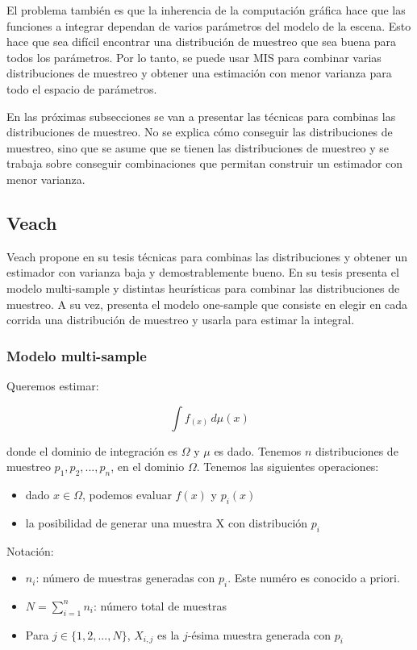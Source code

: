 \documentclass{article}
\begin{document}
El problema también es que la inherencia de la computación gráfica hace que las funciones a integrar dependan de varios parámetros del modelo de la escena.
Esto hace que sea difícil encontrar una distribución de muestreo que sea buena para todos los parámetros.
Por lo tanto, se puede usar MIS para combinar varias distribuciones de muestreo y obtener una estimación con menor varianza para todo el espacio de parámetros.

En las próximas subsecciones se van a presentar las técnicas para combinas las distribuciones de muestreo.
No se explica cómo conseguir las distribuciones de muestreo, sino que se asume que se tienen las distribuciones de muestreo y se trabaja sobre conseguir combinaciones que permitan construir un estimador con menor varianza.

\subsection{Veach}

Veach propone en su tesis técnicas para combinas las distribuciones y obtener un estimador con varianza baja y demostrablemente bueno.
En su tesis presenta el modelo multi-sample y distintas heurísticas para combinar las distribuciones de muestreo.
A su vez, presenta el modelo one-sample que consiste en elegir en cada corrida una distribución de muestreo y usarla para estimar la integral.

\subsubsection{Modelo multi-sample}

Queremos estimar:

$$ \int f_(x) \,d\mu(x)$$

donde el dominio de integración es $\Omega$ y $\mu$ es dado. Tenemos $n$ distribuciones de muestreo $p_{1}, p_{2}, ..., p_{n}$, en el dominio $\Omega$.
Tenemos las siguientes operaciones:
\begin{itemize}
    \item dado $x \in \Omega$, podemos evaluar $f(x)$ y $p_{i}(x)$
    \item la posibilidad de generar una muestra X con distribución $p_{i}$
\end{itemize}

Notación:
\begin{itemize}
    \item $n_{i}$: número de muestras generadas con $p_{i}$. Este numéro es conocido a priori.
    \item $N = \sum_{i=1}^{n} n_{i}$: número total de muestras
    \item Para $j \in \{1, 2, ..., N\}$, $X_{i,j}$ es la $j$-ésima muestra generada con $p_{i}$
\end{itemize}
\end{document}
